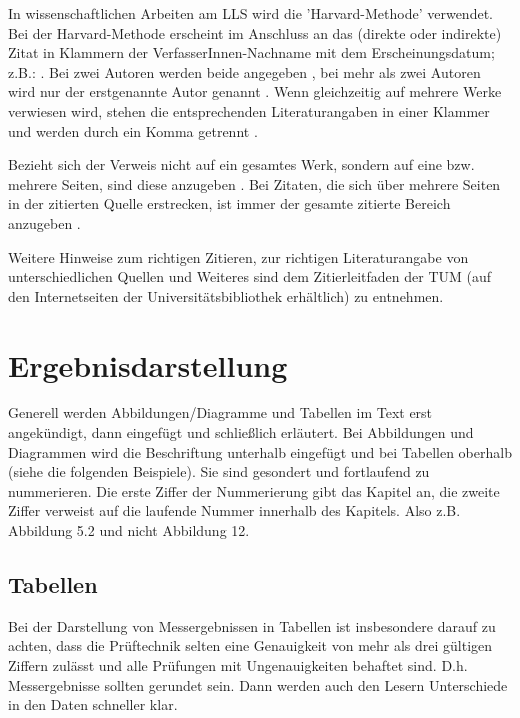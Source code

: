 \documentclass[utf8, a4paper, 11pt, parskip, pointlessnumbers]{scrreprt}
\begin{document}
In wissenschaftlichen Arbeiten am LLS wird die 'Harvard-Methode' verwendet. Bei der Harvard-Methode erscheint im Anschluss an das (direkte oder indirekte) Zitat in Klammern der VerfasserInnen-Nachname mit dem Erscheinungsdatum; z.B.: \citep{Raymer}. Bei zwei Autoren werden beide angegeben \citep{AU92}, bei mehr als zwei Autoren wird nur der erstgenannte Autor genannt \citep{EFanPaper}. Wenn gleichzeitig auf mehrere Werke verwiesen wird, stehen die entsprechenden Literaturangaben in einer Klammer und werden durch ein Komma getrennt \citep{EFanPaper,Raymer,EFanProduction}.

Bezieht sich der Verweis nicht auf ein gesamtes Werk, sondern auf eine bzw. mehrere Seiten, sind diese anzugeben \citep[S.~40]{Raymer}. Bei Zitaten, die sich über mehrere Seiten in der zitierten Quelle erstrecken, ist immer der gesamte zitierte Bereich anzugeben \citep[S.~54-58]{Raymer}.

Weitere Hinweise zum richtigen Zitieren, zur richtigen Literaturangabe von unterschiedlichen Quellen und Weiteres sind dem Zitierleitfaden der TUM (auf den Internetseiten der Universitätsbibliothek erhältlich) zu entnehmen.


\section{Ergebnisdarstellung}
Generell werden Abbildungen/Diagramme und Tabellen im Text erst angekündigt, dann eingefügt und schließlich erläutert. Bei Abbildungen und Diagrammen wird die Beschriftung unterhalb eingefügt und bei Tabellen oberhalb (siehe die folgenden Beispiele). Sie sind gesondert und fortlaufend zu nummerieren. Die erste Ziffer der Nummerierung gibt das Kapitel an, die zweite Ziffer verweist auf die laufende Nummer innerhalb des Kapitels. Also z.B. Abbildung 5.2 und nicht Abbildung 12.


\subsection{Tabellen}
Bei der Darstellung von Messergebnissen in Tabellen ist insbesondere darauf zu achten, dass die Prüftechnik selten eine Genauigkeit von mehr als drei gültigen Ziffern zulässt und alle Prüfungen mit Ungenauigkeiten behaftet sind. D.h. Messergebnisse sollten gerundet sein. Dann werden auch den Lesern Unterschiede in den Daten schneller klar. 
\end{document}
